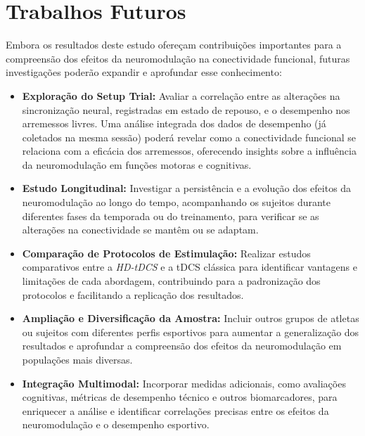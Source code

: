 \section{Trabalhos Futuros}
Embora os resultados deste estudo ofereçam contribuições importantes para a compreensão dos efeitos da neuromodulação na conectividade funcional, futuras investigações poderão expandir e aprofundar esse conhecimento:
\begin{itemize}
    \item \textbf{Exploração do Setup Trial:} Avaliar a correlação entre as alterações na sincronização neural, registradas em estado de repouso, e o desempenho nos arremessos livres. Uma análise integrada dos dados de desempenho (já coletados na mesma sessão) poderá revelar como a conectividade funcional se relaciona com a eficácia dos arremessos, oferecendo insights sobre a influência da neuromodulação em funções motoras e cognitivas.
    
    \item \textbf{Estudo Longitudinal:} Investigar a persistência e a evolução dos efeitos da neuromodulação ao longo do tempo, acompanhando os sujeitos durante diferentes fases da temporada ou do treinamento, para verificar se as alterações na conectividade se mantêm ou se adaptam.
    
    \item \textbf{Comparação de Protocolos de Estimulação:} Realizar estudos comparativos entre a \emph{HD-tDCS} e a tDCS clássica para identificar vantagens e limitações de cada abordagem, contribuindo para a padronização dos protocolos e facilitando a replicação dos resultados.
    
    \item \textbf{Ampliação e Diversificação da Amostra:} Incluir outros grupos de atletas ou sujeitos com diferentes perfis esportivos para aumentar a generalização dos resultados e aprofundar a compreensão dos efeitos da neuromodulação em populações mais diversas.
    
    \item \textbf{Integração Multimodal:} Incorporar medidas adicionais, como avaliações cognitivas, métricas de desempenho técnico e outros biomarcadores, para enriquecer a análise e identificar correlações precisas entre os efeitos da neuromodulação e o desempenho esportivo.
\end{itemize}
